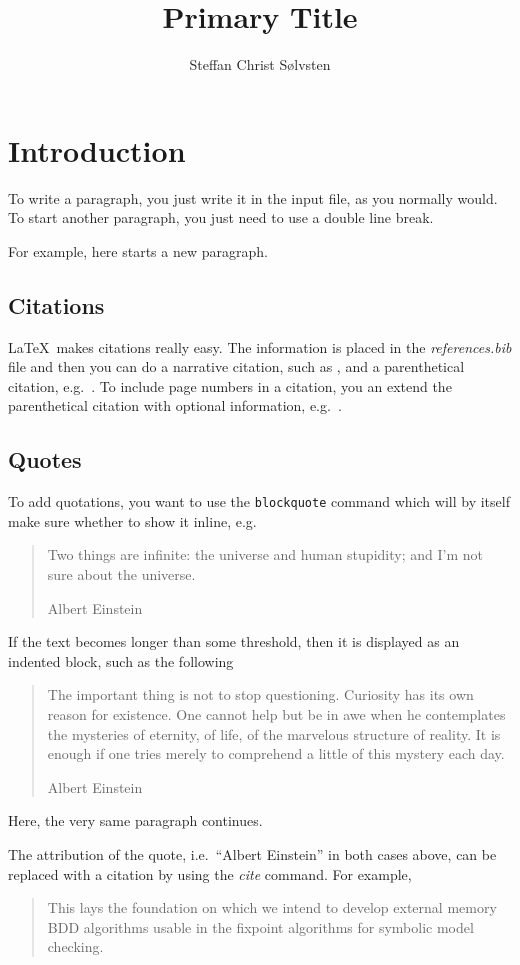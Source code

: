\documentclass[
    a4paper, %
    stu,     %
]{apa7}
\title{Primary Title}
\author{Steffan Christ S{\o}lvsten}
\affiliation{Department of Computer Science, Aarhus University}
\begin{document}
\maketitle
\section{Introduction}
To write a paragraph, you just write it in the input file, as you normally
would. To start another paragraph, you just need to use a double line break.

For example, here starts a new paragraph.

\subsection{Citations}
\LaTeX\ makes citations really easy. The information is placed in the
\emph{references.bib} file and then you can do a narrative citation, such as
\textcite{soelvsten2022:TACAS}, and a parenthetical citation,
e.g.~\parencite{soelvsten2022:TACAS}. To include page numbers in a citation, you 
an extend the parenthetical citation with optional information,
e.g.~\parencite[p.~64]{soelvsten2022:TACAS}.

\subsection{Quotes}
To add quotations, you want to use the \texttt{blockquote} command which will by
itself make sure whether to show it inline, e.g.\
\blockquote[Albert Einstein]{Two things are infinite: the universe and human
stupidity; and I'm not sure about the universe.}
If the text becomes longer than some threshold, then it is displayed
as an indented block, such as the following
\blockquote[Albert Einstein]{The important thing is not to stop questioning.
Curiosity has its own reason for existence. One cannot help but be in awe when he
contemplates the mysteries of eternity, of life, of the marvelous structure of
reality. It is enough if one tries merely to comprehend a little of this mystery
each day.}
Here, the very same paragraph continues.

The attribution of the quote, i.e.\ ``Albert Einstein'' in both cases above, can
be replaced with a citation by using the \emph{cite} command. For example,
\blockquote[\cite{soelvsten2022:TACAS}]{This lays the foundation on which we
intend to develop external memory BDD algorithms usable in the fixpoint algorithms
for symbolic model checking.}

\printbibliography
\end{document}
